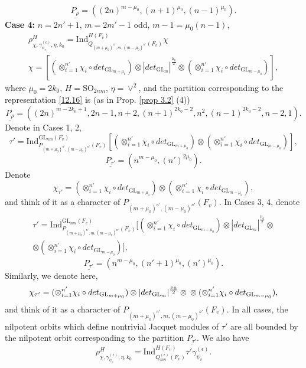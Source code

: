 \documentclass[12pts]{amsart}
\newcommand{\GL}{{\mathrm{GL}}}
\newcommand{\Ind}{{\mathrm{Ind}}}
\newcommand{\SO}{{\mathrm{SO}}}
\begin{document}
$$ 
\underline{P_\rho}=((2n)^{m-\mu_0}, (n+1)^{\mu_0},(n-1)^{\mu_0}).
$$
{\bf Case 4:} $n=2n'+1$, $m=2m'-1$ odd, $m-1=\mu_0(n-1)$,
\begin{multline}\label{12.16}
\rho^H_{\chi,\gamma_{\psi_v}^{(\epsilon)},\eta,k_0}=
\Ind^{H(F_v)}_{Q_{(m+\mu_0)^{n'},m,(m-\mu_0)^{n'}}(F_v)}\chi\\
\chi=[(\otimes_{i=1}^{n'}\chi_i\circ det_{\GL_{m+\mu_0}}) \otimes |det_{\GL_m}|^{\frac{\mu_0}{2}}\otimes (\otimes_{i=1}^{n'}\chi_i\circ det_{\GL_{m-\mu_0}})],
\end{multline}
 where $\mu_0=2k_0$, $H=\SO_{2nm}$, $\eta=\vee^2$, and the partition corresponding to the representation \eqref{12.16} is (as in Prop. \ref{prop 3.2} (4))
 $$
\underline{P_\rho}=((2n)^{m-2k_0+1},2n-1,n+2,(n+1)^{2k_0-2},n^2,(n-1)^{2k_0-2},n-2,1).
$$
Denote in Cases 1, 2,
\begin{equation}\label{12.9}
\tau'=\Ind^{\GL_{nm}(F_v)}_{P_{(m+\mu_0)^{n'},(m-\mu_0)^{n'}}(F_v)}[(\otimes_{i=1}^{n'}\chi_i\circ det_{\GL_{m+\mu_0}}) \otimes (\otimes_{i=1}^{n'}\chi_i\circ det_{\GL_{m-\mu_0}})],
\end{equation}
$$
\underline{P_{\tau'}}=(n^{m-\mu_0}, (n')^{2\mu_0}).
$$
Denote
$$
\chi_{\tau'}=(\otimes_{i=1}^{n'}\chi_i\circ det_{\GL_{m+\mu_0}}) \otimes (\otimes_{i=1}^{n'}\chi_i\circ det_{\GL_{m-\mu_0}}),
$$
and think of it as a character of $P_{(m+\mu_0)^{n'},(m-\mu_0)^{n'}}(F_v)$.
In Cases 3, 4, denote
\begin{multline}\label{12.9.1}
\tau'=
\Ind^{\GL_{nm}(F_v)}_{P_{(m+\mu_0)^{n'},m,(m-\mu_0)^{n'}}(F_v)}[(\otimes_{i=1}^{n'}\chi_i\circ det_{\GL_{m+\mu_0}}) \otimes|det_{\GL_m}|^{\frac{\mu_0}{2}}\otimes\\ 
\otimes(\otimes_{i=1}^{n'}\chi_i\circ det_{\GL_{m-\mu_0}})],
\end{multline}
$$
\underline{P_{\tau'}}=(n^{m-\mu_0}, (n'+1)^{\mu_0}, (n')^{\mu_0}).
$$
Similarly, we denote here,
$$
\chi_{\tau'}=(\otimes_{i=1}^{n'}\chi_i\circ det_{\GL_{m+\mu_0}}) \otimes|det_{\GL_m}|^{\frac{\mu_0}{2}}\otimes\\ 
\otimes(\otimes_{i=1}^{n'}\chi_i\circ det_{\GL_{m-\mu_0}}),
$$
and think of it as a character of $P_{(m+\mu_0)^{n'},m,(m-\mu_0)^{n'}}(F_v)$.
In all cases, the nilpotent orbits which define nontrivial Jacquet modules of  $\tau'$ are all bounded by the nilpotent orbit corresponding to the partition $\underline{P_{\tau'}}$. We also have 
\begin{equation}\label{12.10}
\rho^H_{\chi,\gamma_{\psi_v}^{(\epsilon)},\eta,k_0}=\Ind^{H(F_v)}_{Q^{(\epsilon)}_{mn}(F_v)}\tau'\gamma_{\psi_v}^{(\epsilon)}.
\end{equation}
\end{document}

